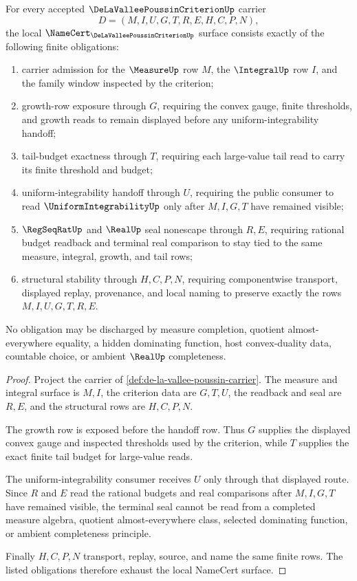 \begin{theorem}\label{thm:de-la-vallee-poussin-namecert-obligations}
For every accepted $\DeLaValleePoussinCriterionUp$ carrier
$$
D=(M,I,U,G,T,R,E,H,C,P,N),
$$
the local $\NameCert_{\DeLaValleePoussinCriterionUp}$ surface consists exactly of the following finite obligations:
\begin{enumerate}
\item carrier admission for the $\MeasureUp$ row $M$, the $\IntegralUp$ row $I$, and the family window inspected by the criterion;
\item growth-row exposure through $G$, requiring the convex gauge, finite thresholds, and growth reads to remain displayed before any uniform-integrability handoff;
\item tail-budget exactness through $T$, requiring each large-value tail read to carry its finite threshold and budget;
\item uniform-integrability handoff through $U$, requiring the public consumer to read $\UniformIntegrabilityUp$ only after $M,I,G,T$ have remained visible;
\item $\RegSeqRatUp$ and $\RealUp$ seal nonescape through $R,E$, requiring rational budget readback and terminal real comparison to stay tied to the same measure, integral, growth, and tail rows;
\item structural stability through $H,C,P,N$, requiring componentwise transport, displayed replay, provenance, and local naming to preserve exactly the rows $M,I,U,G,T,R,E$.
\end{enumerate}
No obligation may be discharged by measure completion, quotient almost-everywhere equality, a hidden dominating function, host convex-duality data, countable choice, or ambient $\RealUp$ completeness.
\end{theorem}
\begin{proof}
Project the carrier of \autoref{def:de-la-vallee-poussin-carrier}. The measure and integral surface is $M,I$, the criterion data are $G,T,U$, the readback and seal are $R,E$, and the structural rows are $H,C,P,N$.

The growth row is exposed before the handoff row. Thus $G$ supplies the displayed convex gauge and inspected thresholds used by the criterion, while $T$ supplies the exact finite tail budget for large-value reads.

The uniform-integrability consumer receives $U$ only through that displayed route. Since $R$ and $E$ read the rational budgets and real comparisons after $M,I,G,T$ have remained visible, the terminal seal cannot be read from a completed measure algebra, quotient almost-everywhere class, selected dominating function, or ambient completeness principle.

Finally $H,C,P,N$ transport, replay, source, and name the same finite rows. The listed obligations therefore exhaust the local NameCert surface.
\end{proof}

